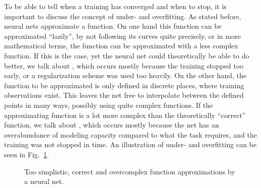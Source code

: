 		 	To be able to tell when a training has converged and when to stop, it is important to discuss the concept of under- and overfitting.
		 	As stated before, neural nets approximate a function.
		 	On one hand this function can be approximated ``lazily'', by not following its curves quite precisely, or in more mathematical terms, the function can be approximated with a less complex function.
		 	If this is the case, yet the neural net could theoretically be able to do better, we talk about , which occurs mostly because the training stopped too early, or a regularization scheme was used too heavily.
		 	On the other hand, the function to be approximated is only defined in discrete places, where training observations exist.
		 	This leaves the net free to interpolate between the defined points in many ways, possibly using quite complex functions.
		 	If the approximating function is a lot more complex than the theoretically ``correct'' function, we talk about , which occurs mostly because the net has an overabundance of modeling capacity compared to what the task requires, and the training was not stopped in time.
		 	An illustration of under- and overfitting can be seen in Fig.~\ref{fig:fitting}.
		 	
			\begin{figure}[ht]
				\centering
				\caption[Over- and underfitting]{Too simplistic, correct and overcomplex function approximations by a neural net.}
				\label{fig:fitting}
			\end{figure}
		 	
